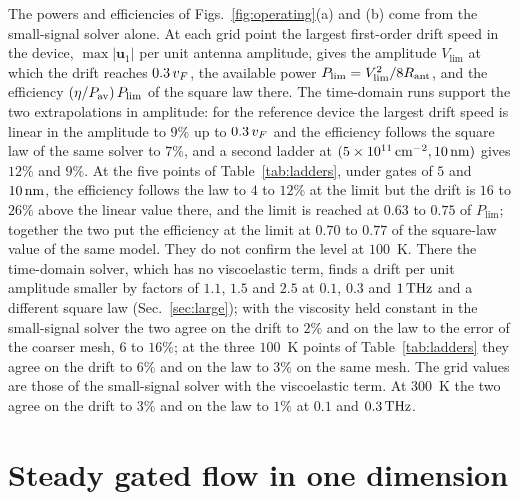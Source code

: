 The powers and efficiencies of Figs.~\ref{fig:operating}(a) and (b) come
from the small-signal solver alone. At each grid point the largest
first-order drift speed in the device, $\max|\bm{u}_{1}|$ per unit antenna
amplitude, gives the amplitude $V_{\mathrm{lim}}$ at which the drift
reaches $0.3\,v_{F}$, the available power
$P_{\mathrm{lim}}=V_{\mathrm{lim}}^{2}/8R_{\mathrm{ant}}$, and the efficiency
$(\eta/P_{\mathrm{av}})\,P_{\mathrm{lim}}$ of the square law there. The time-domain
runs support the two extrapolations in amplitude: for the reference
device the largest drift speed
is linear in the amplitude to $9\%$ up to $0.3\,v_{F}$ and the efficiency
follows the square law of the same solver to $7\%$, and a second ladder
at $(5\times10^{11}\,\mathrm{cm^{-2}},10\,\mathrm{nm})$ gives $12\%$ and $9\%$. At the five
points of Table~\ref{tab:ladders}, under gates of $5$ and $10\,\mathrm{nm}$, the
efficiency follows the law to $4$ to $12\%$ at the limit but the drift
is $16$ to $26\%$ above the linear value there, and the limit is reached
at $0.63$ to $0.75$ of $P_{\mathrm{lim}}$; together the two put the
efficiency at the limit at $0.70$ to $0.77$ of the square-law value of
the same model. They do not
confirm the level at $100$~K. There the time-domain solver, which has no
viscoelastic term, finds a drift per unit amplitude smaller by factors of
$1.1$, $1.5$ and $2.5$ at $0.1$, $0.3$ and $1\,\mathrm{THz}$ and a different square
law (Sec.~\ref{sec:large}); with the viscosity held constant in the
small-signal solver the two agree on the drift to $2\%$ and on the law
to the error of the coarser mesh, $6$ to $16\%$; at the three $100$~K
points of Table~\ref{tab:ladders} they agree on the drift to $6\%$ and
on the law to $3\%$ on the same mesh. The grid values are
those of the small-signal solver with the viscoelastic term. At $300$~K the two agree on the drift to $3\%$ and on the law to
$1\%$ at $0.1$ and $0.3\,\mathrm{THz}$.

\section{Steady gated flow in one dimension}
\label{app:gated}

